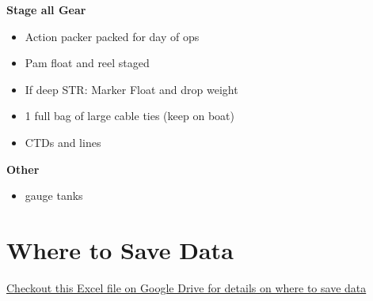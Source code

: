 \documentclass[]{book}
\providecommand{\tightlist}{%
  \setlength{\itemsep}{0pt}\setlength{\parskip}{0pt}}
\begin{document}
\textbf{Stage all Gear}

\begin{itemize}
\tightlist
\item
  Action packer packed for day of ops
\item
  Pam float and reel staged
\item
  If deep STR: Marker Float and drop weight
\item
  1 full bag of large cable ties (keep on boat)
\item
  CTDs and lines
\end{itemize}

\textbf{Other}

\begin{itemize}
\tightlist
\item
  gauge tanks
\end{itemize}

\hypertarget{where-to-save-data}{%
\section{Where to Save Data}\label{where-to-save-data}}

\href{https://drive.google.com/open?id=16l1OQgGEunLoADh_MEGyIfbQL2w0u6aw}{Checkout this Excel file on Google Drive for details on where to save data}
\end{document}

